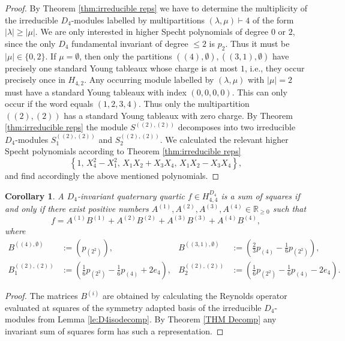 \documentclass[11pt,a4paper]{amsart}
\numberwithin{equation}{section}
\newtheorem{cor}[thm]{Corollary}
\theoremstyle{definition}
\newcommand{\R}{\mathbb{R}}
\numberwithin{thm}{section}
\theoremstyle{break}
\numberwithin{subcase}{case}
\begin{document}
\begin{proof}
By Theorem \ref{thm:irreducible reps} we have to determine the multiplicity of the irreducible $D_4$-modules labelled by multipartitions $(\lambda,\mu) \vdash 4$ of the form $|\lambda|\geq |\mu|$. We are only interested in higher Specht polynomials of degree $0$ or $2$, since the only $D_4$ fundamental invariant of degree $\leq 2$ is $p_2$. Thus it must be $|\mu|\in \{0,2\}$. If $\mu = \emptyset$, then only the partitions $((4),\emptyset),((3,1),\emptyset)$ have precisely one standard Young tableaux whose charge is at most $1$, i.e., they occur precisely once in $H_{4,2}$. Any occurring module labelled by $(\lambda,\mu)$ with $|\mu|=2$ must have a standard Young tableaux with index $(0,0,0,0)$. This can only occur if the word equals $(1,2,3,4)$. Thus only the multipartition $((2),(2))$ has a standard Young tableaux with zero charge. By Theorem \ref{thm:irreducible reps} the module $S^{((2),(2))}$ decomposes into two irreducible $D_4$-modules $S_1^{((2),(2))}$ and $S_2^{((2),(2))}$. We calculated the relevant higher Specht polynomials according to Theorem \ref{thm:irreducible reps}
$$\left\{1,\, X_4^2-X_1^2,\, X_1X_2+X_3X_4,\, X_1X_2-X_3X_4\right\},$$ and find accordingly the above mentioned polynomials.
\end{proof}
\begin{cor}
A $D_4$-invariant quaternary quartic $f \in H_{4,4}^{D_4}$ is a sum of squares if and only if there exist positive numbers $A^{(1)},A^{(2)},A^{(3)},A^{(4)} \in \R_{\geq 0}$ such that $$ f = A^{(1)}B^{(1)}+ A^{(2)}B^{(2)}+A^{(3)}B^{(3)}+A^{(4)}B^{(4)},$$ where  
\begin{align*}
    B^{((4),\emptyset)} &:= \left( p_{(2^2)} \right),&
    B^{((3,1),\emptyset)} &:= \left( \frac{2}{3}p_{(4)}-\frac{1}{6}p_{(2^2)}\right), \\
    B_1^{((2),(2))} &:= \left( \frac{1}{6}p_{(2^2)}-\frac{1}{6}p_{(4)}+2e_4 \right), &
    B_2^{((2),(2))} &:= \left( \frac{1}{6}p_{(2^2)}-\frac{1}{6}p_{(4)}-2e_4 \right).
\end{align*}
\end{cor}
\begin{proof}
The matrices $B^{(i)}$ are obtained by calculating the Reynolds operator evaluated at squares of the symmetry adapted basis of the irreducible $D_4$-modules from Lemma \ref{le:D4isodecomp}. By Theorem \ref{THM Decomp} any invariant sum of squares form has such a representation.
\end{proof}
\end{document}
